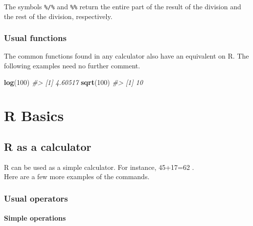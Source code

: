 \documentclass[]{book}
\newenvironment{Shaded}{}{}
\newcommand{\CommentTok}[1]{\textcolor[rgb]{0.38,0.63,0.69}{\textit{#1}}}
\newcommand{\DecValTok}[1]{\textcolor[rgb]{0.25,0.63,0.44}{#1}}
\newcommand{\KeywordTok}[1]{\textcolor[rgb]{0.00,0.44,0.13}{\textbf{#1}}}
\newcommand{\NormalTok}[1]{#1}
\newcommand{\OperatorTok}[1]{\textcolor[rgb]{0.40,0.40,0.40}{#1}}
\theoremstyle{definition}
\theoremstyle{definition}
\theoremstyle{definition}
\theoremstyle{remark}
\begin{document}
The symbols \texttt{\%/\%} and \texttt{\%\%} return the entire part of
the result of the division and the rest of the division, respectively.

\begin{Shaded}
\end{Shaded}

\hypertarget{usual-functions}{%
\section{Usual functions}\label{usual-functions}}

The common functions found in any calculator also have an equivalent on
R. The following examples need no further comment.

\begin{Shaded}
\begin{Highlighting}[]
\KeywordTok{log}\NormalTok{(}\DecValTok{100}\NormalTok{)}
\CommentTok{#> [1] 4.60517}
\KeywordTok{sqrt}\NormalTok{(}\DecValTok{100}\NormalTok{)}
\CommentTok{#> [1] 10}
\end{Highlighting}
\end{Shaded}

\hypertarget{part-r-basics-1}{%
\part{R Basics}\label{part-r-basics-1}}

\hypertarget{rcalc}{%
\chapter{R as a calculator}\label{rcalc}}

R can be used as a simple calculator. For instance, 45+17=62 .\\
Here are a few more examples of the commands.

\hypertarget{usual-operators-1}{%
\section{Usual operators}\label{usual-operators-1}}

\hypertarget{simple-operations-1}{%
\subsection{Simple operations}\label{simple-operations-1}}
\end{document}
